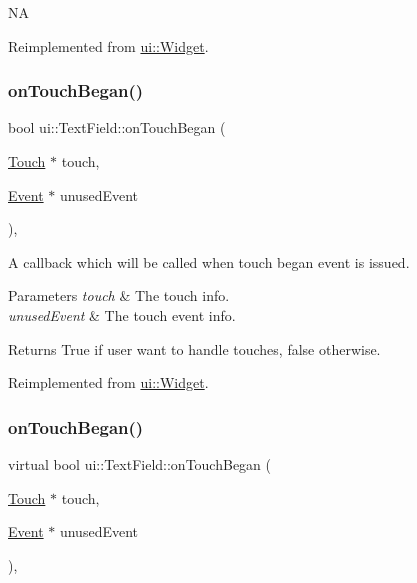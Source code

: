 NA 

Reimplemented from \hyperlink{classui_1_1Widget_a9cda9b9ffbf77a8ed695e6b97b9a46cc}{ui\+::\+Widget}.

\mbox{\label{classui_1_1TextField_a4716933981fd6f75e03baed7ec565587}} 
\subsubsection{\texorpdfstring{on\+Touch\+Began()}{onTouchBegan()}\hspace{0.1cm}{\footnotesize\ttfamily [1/2]}}
{\footnotesize\ttfamily bool ui\+::\+Text\+Field\+::on\+Touch\+Began (\begin{DoxyParamCaption}\item[{\hyperlink{classTouch}{Touch} $\ast$}]{touch,  }\item[{\hyperlink{classEvent}{Event} $\ast$}]{unused\+Event }\end{DoxyParamCaption})\hspace{0.3cm}{\ttfamily [override]}, {\ttfamily [virtual]}}

A callback which will be called when touch began event is issued. 
\begin{DoxyParams}{Parameters}
{\em touch} & The touch info. \\
\hline
{\em unused\+Event} & The touch event info. \\
\hline
\end{DoxyParams}
\begin{DoxyReturn}{Returns}
True if user want to handle touches, false otherwise. 
\end{DoxyReturn}


Reimplemented from \hyperlink{classui_1_1Widget_a7885c770dde6daef771515c9857674a8}{ui\+::\+Widget}.

\mbox{\label{classui_1_1TextField_ad747be5e9c98b2aa44d839dfd282fc2e}} 
\subsubsection{\texorpdfstring{on\+Touch\+Began()}{onTouchBegan()}\hspace{0.1cm}{\footnotesize\ttfamily [2/2]}}
{\footnotesize\ttfamily virtual bool ui\+::\+Text\+Field\+::on\+Touch\+Began (\begin{DoxyParamCaption}\item[{\hyperlink{classTouch}{Touch} $\ast$}]{touch,  }\item[{\hyperlink{classEvent}{Event} $\ast$}]{unused\+Event }\end{DoxyParamCaption})\hspace{0.3cm}{\ttfamily [override]}, {\ttfamily [virtual]}}

